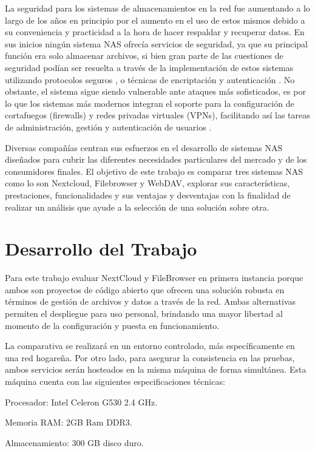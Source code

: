 \documentclass[a4paper,10pt]{article}
\begin{document}
	La seguridad para los sistemas de almacenamientos en la red fue aumentando a lo largo de los años en principio por el aumento en el uso de estos mismos debido a su conveniencia y practicidad a la hora de hacer respaldar y recuperar datos. En sus inicios ningún sistema NAS ofrecía servicios de seguridad, ya que su principal función era solo almacenar archivos, si bien gran parte de las cuestiones de seguridad podían ser resuelta a través de la implementación de estos sistemas utilizando protocolos seguros \citep{gibson1996case}, o técnicas de encriptación y autenticación \citep{miller2002strong}. No obstante, el sistema sigue siendo vulnerable ante ataques más sofisticados, es por lo que los sistemas más modernos integran el soporte para la configuración de cortafuegos (firewalls) y redes privadas virtuales (VPNs), facilitando así las tareas de administración, gestión y autenticación de usuarios \citep{Edelson_2004}.
	
	Diversas compañías centran sus esfuerzos en el desarrollo de sistemas NAS diseñados para cubrir las diferentes necesidades particulares del mercado y de los consumidores finales. El objetivo de este trabajo es comparar tres sistemas NAS como lo son Nextcloud, Filebrowser y WebDAV, explorar sus características, prestaciones, funcionalidades y sus ventajas y desventajas con la finalidad de realizar un análisis que ayude a la selección de una solución sobre otra.
	
	\section{Desarrollo del Trabajo}
	Para este trabajo evaluar NextCloud y FileBrowser en primera instancia porque ambos son proyectos de código abierto que ofrecen una solución robusta en términos de gestión de archivos y datos a través de la red. Ambas alternativas permiten el despliegue para uso personal, brindando una mayor libertad al momento de la configuración y puesta en funcionamiento.
	
	La comparativa se realizará en un entorno controlado, más específicamente en una red hogareña. Por otro lado, para asegurar la consistencia en las pruebas, ambos servicios serán hosteados en la misma máquina de forma simultánea. Esta máquina cuenta con las siguientes especificaciones técnicas:
	
	Procesador: Intel Celeron G530 2.4 GHz.
	
	Memoria RAM: 2GB Ram DDR3.
	
	Almacenamiento: 300 GB disco duro.
	
\end{document}
